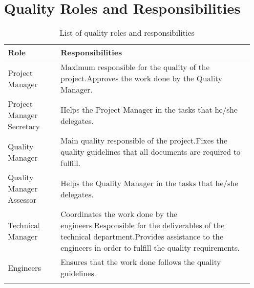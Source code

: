 \section{Quality Roles and Responsibilities}

\begin{longtable}[H]{>{\raggedright\arraybackslash}p{5cm} p{9cm}}
	
	\toprule[2pt]
	
	\textbf{Role} &  \textbf{Responsibilities}   \\
	
	\midrule [1.5pt]
	\endhead
	
	Project Manager & Maximum responsible for the quality of the project.\newline Approves the work done by the Quality Manager.
	\vspace{0.2cm} \\
	
	\midrule
		
	Project Manager Secretary & Helps the Project Manager in the tasks that he/she delegates.
	\vspace{0.2cm} \\
	
	\midrule
	
	Quality Manager & Main quality responsible of the project.\newline Fixes the quality guidelines that all documents are required to fulfill.
	\vspace{0.2cm} \\

	\midrule
	
	Quality Manager Assessor & Helps the Quality Manager in the tasks that he/she delegates.
	\vspace{0.2cm} \\
	
	\midrule
	
	Technical Manager & Coordinates the work done by the engineers.\newline Responsible for the deliverables of the technical department.\newline Provides assistance to the engineers in order to fulfill the quality requirements.
	\vspace{0.2cm} \\
	
	\midrule
	
	Engineers & Ensures that the work done follows the quality guidelines.
	\vspace{0.2cm} \\
	
	\bottomrule[2pt]
	
	\caption{List of quality roles and responsibilities}
	
\end{longtable}